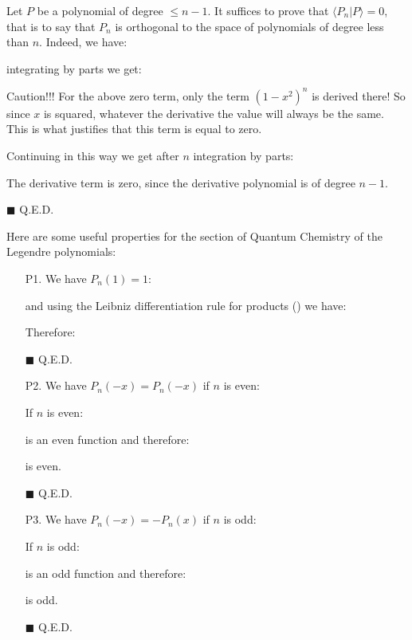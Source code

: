 	\begin{dem}
	Let $P$ be a polynomial of degree $\leq n-1$. It suffices to prove that $\langle P_n | P \rangle =0$, that is to say that $P_n$ is orthogonal to the space of polynomials of degree less than $n$. Indeed, we have:
	
	integrating by parts we get:
	
	
	\begin{tcolorbox}[colback=red!5,borderline={1mm}{2mm}{red!5},arc=0mm,boxrule=0pt]
	\bcbombe Caution!!! For the above zero term, only the term $(1-x^2)^n$ is derived there! So since $x$ is squared, whatever the derivative the value will always be the same. This is what justifies that this term is equal to zero.
	\end{tcolorbox}
	
	
	Continuing in this way we get after $n$ integration by parts:
	
	\begin{tcolorbox}[title=Remark,colframe=black,arc=10pt]
	The derivative term is zero, since the derivative polynomial is of degree $n-1$.
	\end{tcolorbox}
	\begin{flushright}
		$\blacksquare$  Q.E.D.
	\end{flushright}
	\end{dem}	
	Here are some useful properties for the section of Quantum Chemistry of the Legendre polynomials:
	\begin{enumerate}
		\item[P1.] We have $P_n(1)=1$:
		\begin{dem}
		
		and using the Leibniz differentiation rule for products () we have:
		
		Therefore:
		
		\begin{flushright}
			$\blacksquare$  Q.E.D.
		\end{flushright}
		\end{dem}

		\item[P2.] We have $P_n(-x)=P_n(-x)$ if $n$ is even:
		\begin{dem}
		If $n$ is even:
		
		is an even function and therefore:
		
		is even.
		\begin{flushright}
			$\blacksquare$  Q.E.D.
		\end{flushright}
		\end{dem}

		\item[P3.] We have $P_n(-x)=-P_n(x)$ if $n$ is odd:
		\begin{dem}
		If $n$ is odd:
		
		is an odd function and therefore:
		
		is odd.
		\begin{flushright}
			$\blacksquare$  Q.E.D.
		\end{flushright}
		\end{dem}
	\end{enumerate}
